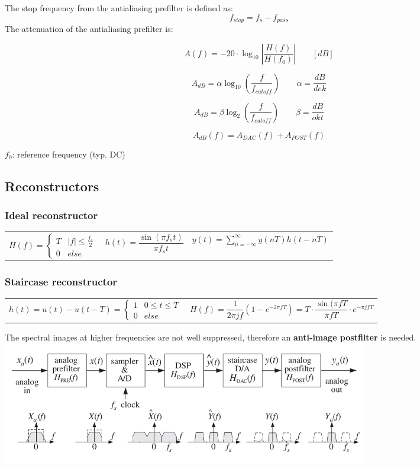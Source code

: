 The stop frequency from the antialiasing prefilter is defined as:
\[ f_{stop} = f_s - f_{pass} \]
The attenuation of the antialiasing prefilter is:

\[ A(f) = -20 \cdot \log_{10}{\left|\frac{H(f)}{H(f_0)}\right|} \qquad [dB] \]

\[ A_{dB} = \alpha \log_{10}(\frac{f}{f_{cutoff}}) \qquad \alpha = \frac{dB}{dek} \]

\[ A_{dB} = \beta \log_{2}(\frac{f}{f_{cutoff}}) \qquad \beta = \frac{dB}{okt} \]

\[ A_{dB}(f) = A_{DAC}(f) + A_{POST}(f) \]

$f_0$: reference frequency (typ. DC)

\subsection{Reconstructors }
\subsubsection{Ideal reconstructor }
  \begin{tabular}{p{5cm}p{4cm}p{6cm}}
	  $H(f) = \left\lbrace \begin{matrix}
	    T & |f| \leq \frac{f_s}{2} \\
	    0 & else
	  \end{matrix}\right.$ & 
    $h(t) = \dfrac{\sin(\pi f_s t)}{\pi f_s t}$ &
    $y(t) = \sum\limits_{n=-\infty}^\infty y(nT)h(t-nT)$
  \end{tabular}
  

\subsubsection{Staircase reconstructor }
  \begin{tabular}{p{8cm}p{8cm}}
    $h(t) = u(t) - u(t-T) = \left\lbrace \begin{matrix}
      1 & 0\leq t \leq T \\
      0 & else
    \end{matrix}\right.$ &
    $H(f) = \dfrac{1}{2\pi j f}(1-e^{-2\pi f T}) = T \cdot \dfrac{\sin(\pi f T}{\pi f T}\cdot e^{-\pi j f T}$
  \end{tabular}
  
  The spectral images at higher frequencies are not well suppressed, therefore an \textbf{anti-image postfilter} is needed.\\
  \includegraphics[width=16cm]{./picture/compOfDSPSystem}
  

  
  
